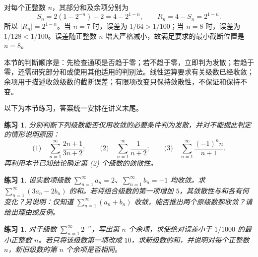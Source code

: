 \documentclass[UTF8,fontset=fandol,11pt]{ctexart}
\newtheorem{exercise}[definition]{练习}
\begin{document}
对每个正整数 $n$，其部分和及余项分别为
\[
S_n=2(1-2^{-n})+2=4-2^{1-n},\qquad
R_n=4-S_n=2^{1-n}.
\]
所以 $|R_n|=2^{1-n}$。当 $n=7$ 时，误差为 $1/64>1/100$；当 $n=8$ 时，误差为 $1/128<1/100$。误差随正整数 $n$ 增大严格减小，故满足要求的最小截断位置是 $n=8$。\par
本节的判断顺序是：先检查通项是否趋于零；若不趋于零，立即判为发散；若趋于零，还需研究部分和或使用其他适用的判别法。线性运算要求有关级数已经收敛；余项用于描述收敛级数的截断误差；有限项改变只保持敛散性，不保证和保持不变。

以下为本节练习，答案统一安排在讲义末尾。\par
\begin{exercise}
\label{mathagent:exercise:e69b7a0304c206dceae958714ab74feb67aaa37cb599d9dda82205d9e3e9f289}
分别判断下列级数能否仅用收敛的必要条件判为发散，并对不能据此判定的情形说明原因：
\[
\text{(1)}\quad\sum_{n=1}^{\infty}\frac{2n+1}{3n+2};\qquad
\text{(2)}\quad\sum_{n=1}^{\infty}\frac1{n+2};\qquad
\text{(3)}\quad\sum_{n=1}^{\infty}\frac{(-1)^n n}{n+1}.
\]
再利用本节已知结论确定第 (2) 个级数的敛散性。
\end{exercise}
\begin{exercise}
\label{mathagent:exercise:fae67726e3f6b1d71e0285711b2976ac356374939815f4c70d1ae93b03238b0b}
设实数项级数 $\sum_{n=1}^{\infty}a_n=2$、$\sum_{n=1}^{\infty}b_n=-1$ 均收敛。求 $\sum_{n=1}^{\infty}(3a_n-2b_n)$ 的和。若将组合级数的第一项增加 $5$，其敛散性与和各有何变化？另说明：仅知道 $\sum_{n=1}^{\infty}(a_n+b_n)$ 收敛，能否推出两个原级数都收敛？请给出理由或反例。
\end{exercise}
\begin{exercise}
\label{mathagent:exercise:da9ebfc8f5e631cba145a91d6f8cb2ebfd5769c096981b72d3d911dc8b435e5d}
对于级数 $\sum_{n=1}^{\infty}2^{-n}$，写出第 $n$ 个余项，求使绝对误差小于 $1/1000$ 的最小正整数 $n$。若只将该级数第一项改成 $10$，求新级数的和，并说明对每个正整数 $n$，新旧级数的第 $n$ 个余项是否相同。
\end{exercise}
\end{document}
